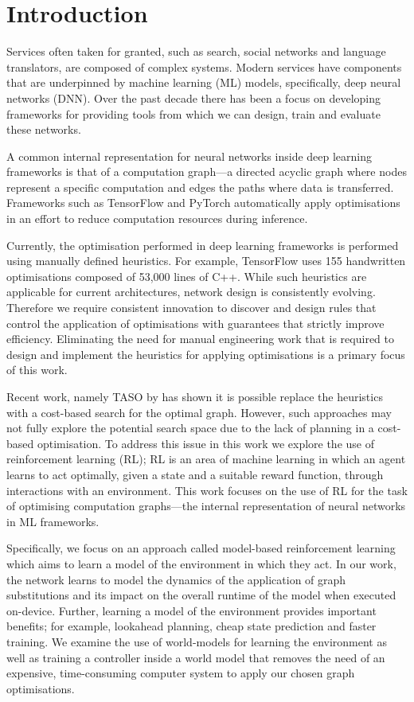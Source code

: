 \chapter{Introduction}

Services often taken for granted, such as search, social networks and language translators, are composed of complex systems. Modern services have components that are underpinned by machine learning (ML) models, specifically, deep neural networks (DNN). Over the past decade there has been a focus on developing frameworks for providing tools from which we can design, train and evaluate these networks.

A common internal representation for neural networks inside deep learning frameworks is that of a computation graph---a directed acyclic graph where nodes represent a specific computation and edges the paths where data is transferred. Frameworks such as TensorFlow \cite{tensorflow2015-whitepaper} and PyTorch \cite{pytorch} automatically apply optimisations in an effort to reduce computation resources during inference.

Currently, the optimisation performed in deep learning frameworks is performed using manually defined heuristics. For example, TensorFlow \cite{tensorflow2015-whitepaper} uses 155 handwritten optimisations composed of 53,000 lines of C++. While such heuristics are applicable for current architectures, network design is consistently evolving. Therefore we require consistent innovation to discover and design rules that control the application of optimisations with guarantees that strictly improve efficiency. Eliminating the need for manual engineering work that is required to design and implement the heuristics for applying optimisations is a primary focus of this work.

Recent work, namely TASO by \citet{jia2019taso,jia2019optimizing} has shown it is possible replace the heuristics with a cost-based search for the optimal graph. However, such approaches may not fully explore the potential search space due to the lack of planning in a cost-based optimisation. To address this issue in this work we explore the use of reinforcement learning (RL); RL is an area of machine learning in which an agent learns to act optimally, given a state and a suitable reward function, through interactions with an environment. This work focuses on the use of RL for the task of optimising computation graphs---the internal representation of neural networks in ML frameworks.

Specifically, we focus on an approach called model-based reinforcement learning which aims to learn a model of the environment in which they act. In our work, the network learns to model the dynamics of the application of graph substitutions and its impact on the overall runtime of the model when executed on-device. Further, learning a model of the environment provides important benefits; for example, lookahead planning, cheap state prediction and faster training. We examine the use of world-models for learning the environment as well as training a controller inside a world model that removes the need of an expensive, time-consuming computer system to apply our chosen graph optimisations.

